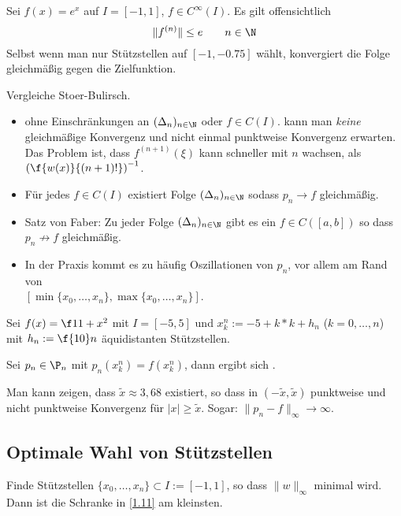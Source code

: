 \documentclass[11pt]{scrbook}
\begin{document}
\begin{ex*}
	Sei $f(x)=e^x$ auf $I=[-1,1]$, $f\in C^\infty(I)$.
	Es gilt offensichtlich
	\[
		\|f^{(n)}\| \le e \qquad n\in \N
	\]
	Selbst wenn man nur Stützstellen auf $[-1,-0.75]$ wählt, konvergiert die Folge gleichmäßig gegen die Zielfunktion.
\end{ex*}

\begin{note}
	Vergleiche Stoer-Bulirsch.
	\begin{itemize}
		\item
			ohne Einschränkungen an $(\Delta_n)_{n\in \N}$ oder $f\in C(I)$. kann man \emph{keine} gleichmäßige Konvergenz und nicht einmal punktweise Konvergenz erwarten.
			Das Problem ist, dass $f^{(n+1)}(\xi)$ kann schneller mit $n$ wachsen, als $\left(\f {w(x)}{(n+1)!}\right)^{-1}$.	
		\item
			Für jedes $f\in C(I)$ existiert Folge $(\Delta_n)_{n\in \N}$ sodass $p_n\to f$ gleichmäßig.
		\item
			Satz von Faber: Zu jeder Folge $(\Delta_n)_{n\in \N}$ gibt es ein $f\in C([a,b])$ so dass $p_n\not\to f$ gleichmäßig.
		\item
			In der Praxis kommt es zu häufig Oszillationen von $p_n$, vor allem am Rand von\\ $[ \min\{x_0,\dotsc, x_n\},\max\{x_0,\dotsc,x_n\} ]$.
	\end{itemize}
\end{note}

\begin{ex*}[Runge]
	Sei $f(x)= \f 1{1+x^2}$ mit $I=[-5,5]$ und $x_k^n := -5+k*k+h_n$ ($k=0,\dotsc,n$) mit $h_n:= \f {10}n$ äquidistanten Stützstellen.

	Sei $p_n\in \P_n$ mit $p_n(x_k^n) = f(x_k^n)$, dann ergibt sich \fixme[Oszillationen].
	
	Man kann zeigen, dass $\tilde x \approx 3,68$ existiert, so dass in $(-\tilde x,\tilde x)$ punktweise und nicht punktweise Konvergenz für $|x|\ge \tilde x$. Sogar: $\|p_n-f\|_\infty \to \infty$.
\end{ex*}

\subsection{Optimale Wahl von Stützstellen}

Finde Stützstellen $\{x_0,\dotsc,x_n\}\subset I := [-1,1]$, so dass $\|w\|_\infty$ minimal wird.
Dann ist die Schranke in \ref{1.11} am kleinsten.
\end{document}
